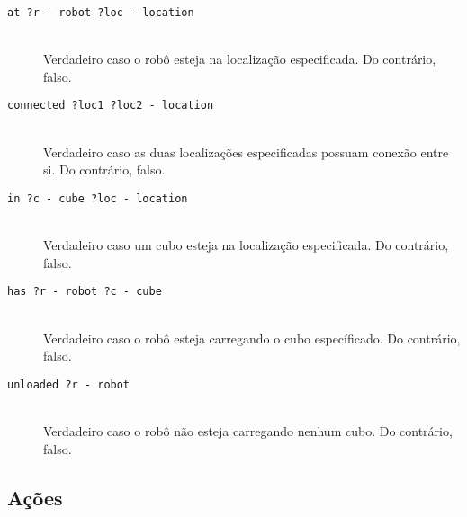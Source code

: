 \documentclass[letterpaper]{article}
\begin{document}
\begin{description}
\item[\texttt{at ?r - robot ?loc - location}]\hfill\\ Verdadeiro caso o robô esteja na localização especificada. Do contrário, falso.
\item[\texttt{connected ?loc1 ?loc2 - location}]\hfill\\ Verdadeiro caso as duas localizações especificadas possuam conexão entre si. Do contrário, falso.
\item[\texttt{in ?c - cube ?loc - location}]\hfill\\ Verdadeiro caso um cubo esteja na localização especificada. Do contrário, falso.
\item[\texttt{has ?r - robot ?c - cube}]\hfill\\ Verdadeiro caso o robô esteja carregando o cubo específicado. Do contrário, falso.
\item[\texttt{unloaded ?r - robot}]\hfill\\ Verdadeiro caso o robô não esteja carregando nenhum cubo. Do contrário, falso.
\end{description}

\subsection{Ações}
\end{document}
